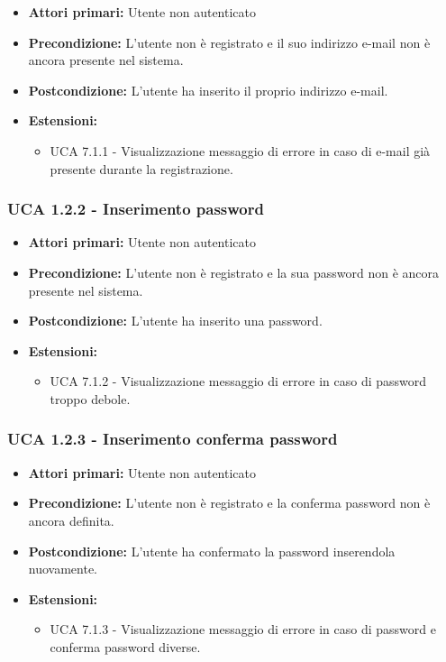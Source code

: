 \begin{itemize}
\item \textbf{Attori primari:} Utente non autenticato
\item \textbf{Precondizione:} L'utente non è registrato e il suo indirizzo e-mail non è ancora presente nel sistema.
\item \textbf{Postcondizione:} L'utente ha inserito il proprio indirizzo e-mail.
\item \textbf{Estensioni:}
	\begin{itemize}
		\item UCA 7.1.1 - Visualizzazione messaggio di errore in caso di e-mail già presente durante la registrazione.
	\end{itemize}
\end{itemize}

\subsubsection{UCA 1.2.2 - Inserimento password}%
\begin{itemize}
\item \textbf{Attori primari:} Utente non autenticato
\item \textbf{Precondizione:} L'utente non è registrato e la sua password non è ancora presente nel sistema.
\item \textbf{Postcondizione:} L'utente ha inserito una password.
\item \textbf{Estensioni:}
	\begin{itemize}
		\item UCA 7.1.2 - Visualizzazione messaggio di errore in caso di password troppo debole.
	\end{itemize}
\end{itemize}

\subsubsection{UCA 1.2.3 - Inserimento conferma password}%
\begin{itemize}
\item \textbf{Attori primari:} Utente non autenticato
\item \textbf{Precondizione:} L'utente non è registrato e la conferma password non è ancora definita.
\item \textbf{Postcondizione:} L'utente ha confermato la password inserendola nuovamente.
\item \textbf{Estensioni:}
	\begin{itemize}
		\item UCA 7.1.3 - Visualizzazione messaggio di errore in caso di password e conferma password diverse.
	\end{itemize}
\end{itemize}

